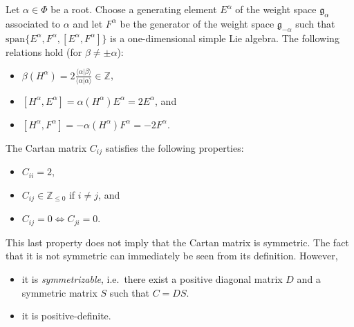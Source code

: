     \begin{property}
        Let $\alpha\in\Phi$ be a root. Choose a generating element $E^\alpha$ of the weight space $\mathfrak{g}_\alpha$ associated to $\alpha$ and let $F^\alpha$ be the generator of the weight space $\mathfrak{g}_{-\alpha}$ such that $\mathrm{span}\{E^\alpha,F^\alpha,[E^\alpha,F^\alpha]\}$ is a one-dimensional simple Lie algebra. The following relations hold (for $\beta\neq\pm\alpha$):
        \begin{itemize}
            \item $\beta(H^\alpha) = 2\frac{\langle\alpha|\beta\rangle}{\langle\alpha|\alpha\rangle}\in\mathbb{Z}$,
            \item $[H^\alpha,E^\alpha] = \alpha(H^\alpha)E^\alpha = 2E^\alpha$, and
            \item $[H^\alpha,F^\alpha] = -\alpha(H^\alpha)F^\alpha = -2F^\alpha$.
        \end{itemize}
    \end{property}

    \begin{property}\label{lie:cartan_prop}
        The Cartan matrix $C_{ij}$ satisfies the following properties:
        \begin{itemize}
            \item $C_{ii}=2$,
            \item $C_{ij}\in\mathbb{Z}_{\leq0}$ if $i\neq j$, and
            \item $C_{ij}=0\iff C_{ji}=0$.
        \end{itemize}
        This last property does not imply that the Cartan matrix is symmetric. The fact that it is not symmetric can immediately be seen from its definition. However,
        \begin{itemize}
            \item it is \textit{symmetrizable}, i.e.~there exist a positive diagonal matrix $D$ and a symmetric matrix $S$ such that $C=DS$.
            \item it is positive-definite.
        \end{itemize}
    \end{property}

